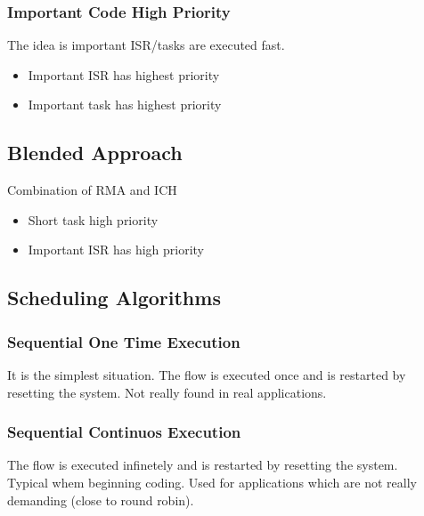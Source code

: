 \subsubsection{Important Code High Priority}
The idea is important ISR/tasks are executed fast.
\begin{itemize}
  \item Important ISR has highest priority
  \item Important task has highest priority
\end{itemize}

\subsection{Blended Approach}
Combination of RMA and ICH
\begin{itemize}
  \item Short task high priority
  \item Important ISR has high priority
\end{itemize}

\subsection{Scheduling Algorithms}

\subsubsection{Sequential One Time Execution}
\begin{paracol}{2}
  It is the simplest situation.
  The flow is executed once and is restarted by resetting the system.
  Not really found in real applications.
  \switchcolumn
  
\end{paracol}
\subsubsection{Sequential Continuos Execution}
\begin{paracol}{2}
  The flow is executed infinetely and is restarted by resetting the system.\\
  Typical whem beginning coding. Used for applications which are not really demanding (close to round robin).
  \switchcolumn
  
\end{paracol}


